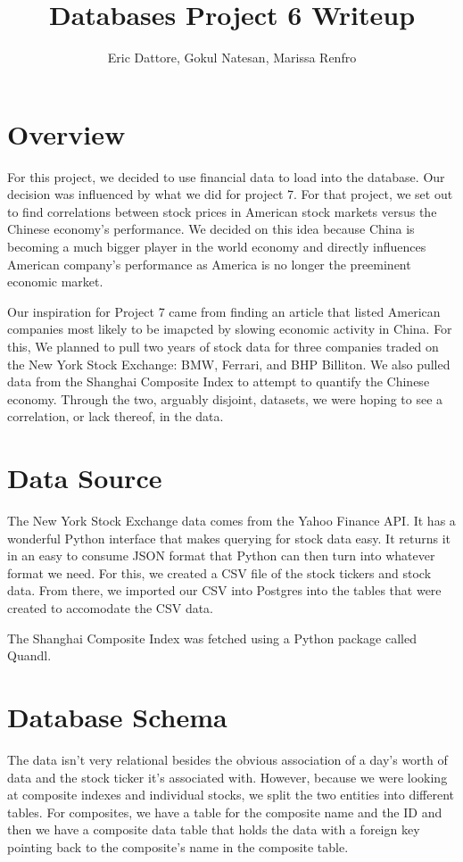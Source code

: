 \documentclass{article}
\author{Eric Dattore, Gokul Natesan, Marissa Renfro}
\title{Databases Project 6 Writeup}
\date{}
\begin{document}
    \maketitle

    \section*{Overview}
    For this project, we decided to use financial data to load into the
    database. Our decision was influenced by what we did for project 7.
    For that project, we set out to find correlations between stock prices
    in American stock markets versus the Chinese economy's performance.
    We decided on this idea because China is becoming a much bigger player
    in the world economy and directly influences American company's performance
    as America is no longer the preeminent economic market.

    Our inspiration for Project 7 came from finding an article that listed American
    companies most likely to be imapcted by slowing economic activity in China. For this,
    We planned to pull two years of stock data for three companies traded on the New York
    Stock Exchange: BMW, Ferrari, and BHP Billiton. We also pulled data from the Shanghai Composite
    Index to attempt to quantify the Chinese economy. Through the two, arguably disjoint, datasets, we
    were hoping to see a correlation, or lack thereof, in the data.
    \section*{Data Source}
    The New York Stock Exchange data comes from the Yahoo Finance API. It has a wonderful Python
    interface that makes querying for stock data easy. It returns it in an easy to consume JSON format
    that Python can then turn into whatever format we need. For this, we created a CSV file of the
    stock tickers and stock data. From there, we imported our CSV into Postgres into the tables that
    were created to accomodate the CSV data.

    The Shanghai Composite Index was fetched using a Python package called Quandl.
    \section*{Database Schema}
    The data isn't very relational besides the obvious association of a day's worth of data and the
    stock ticker it's associated with. However, because we were looking at composite indexes and
    individual stocks, we split the two entities into different tables. For composites, we have a
    table for the composite name and the ID and then we have a composite data table that holds
    the data with a foreign key pointing back to the composite's name in the composite table.
\end{document}

